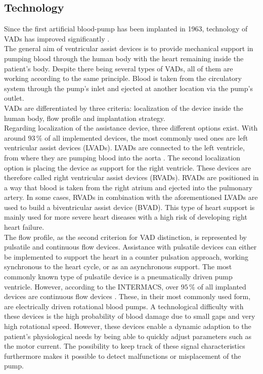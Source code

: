 \subsection{Technology}
Since the first artificial blood-pump has been implanted in 1963, technology of VADs has improved significantly \cite{VAD9}.
\\The general aim of ventricular assist devices is to provide mechanical support in pumping blood through the human body with the heart remaining inside the patient's body. Despite there being several types of VADs, all of them are working according to the same principle. Blood is taken from the circulatory system through the pump's inlet and ejected at another location via the pump's outlet. \cite{VAD1}
\\VADs are differentiated by three criteria: localization of the device inside the human body, flow profile and implantation strategy.
\\Regarding localization of the assistance device, three different options exist. With around $93\, \%$ of all implemented devices, the most commonly used ones are left ventricular assist devices (LVADs). \cite{VAD7} LVADs are connected to the left ventricle, from where they are pumping blood into the aorta \cite{VAD4}. The second localization option is placing the device as support for the right ventricle. These devices are therefore called right ventricular assist devices (RVADs). RVADs are positioned in a way that blood is taken from the right atrium and ejected into the pulmonary artery. \cite{VAD7} In some cases, RVADs in combination with the aforementioned LVADs are used to build a biventricular assist device (BVAD). This type of heart support is mainly used for more severe heart diseases with a high risk of developing right heart failure. \cite{VAD11}
\\The flow profile, as the second criterion for VAD distinction, is represented by pulsatile and continuous flow devices. Assistance with pulsatile devices can either be implemented to support the heart in a counter pulsation approach, working synchronous to the heart cycle, or as an asynchronous support. The most commonly known type of pulsatile device is a pneumatically driven pump ventricle. \cite{VAD1}
However, according to the INTERMACS, over $95\, \%$ of all implanted devices are continuous flow devices \cite{VAD8}. These, in their most commonly used form, are electrically driven rotational blood pumps. A technological difficulty with these devices is the high probability of blood damage due to small gaps and very high rotational speed. However, these devices enable a dynamic adaption to the patient's physiological needs by being able to quickly adjust parameters such as the motor current. The possibility to keep track of these signal characteristics furthermore makes it possible to detect malfunctions or misplacement of the pump. \cite{VAD1}
